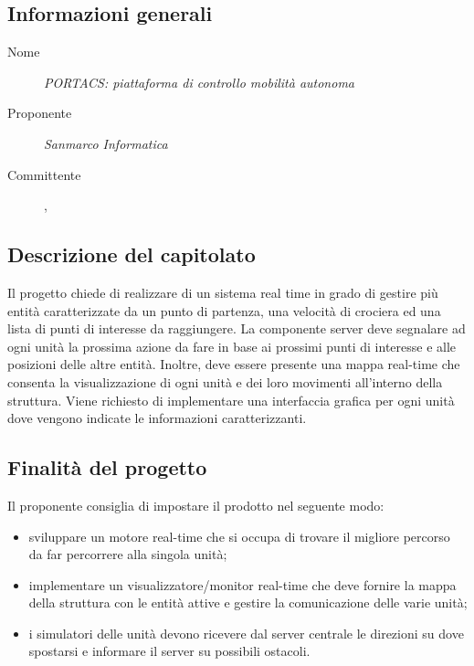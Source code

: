
  \subsection{Informazioni generali}
  \begin{description}
    \item[Nome] \textit{PORTACS: piattaforma di controllo mobilità autonoma}
    \item[Proponente] \textit{Sanmarco Informatica}
    \item[Committente] \VT{}, \CR{}
  \end{description}

  \subsection{Descrizione del capitolato}
Il progetto chiede di realizzare di un sistema real time in grado di gestire più entità caratterizzate da un punto di partenza, una velocità di crociera ed una lista di punti di interesse da raggiungere. La componente server deve segnalare ad ogni unità la prossima azione da fare in base ai prossimi punti di interesse e alle posizioni delle altre entità. Inoltre, deve essere presente una mappa real-time che consenta la visualizzazione di ogni unità e dei loro movimenti all'interno della struttura. Viene richiesto di implementare una interfaccia grafica per ogni unità dove vengono indicate le informazioni caratterizzanti.

  \subsection{Finalità del progetto}
Il proponente consiglia di impostare il prodotto nel seguente modo:
  \begin{itemize}
\item sviluppare un motore real-time che si occupa di trovare il migliore percorso da far percorrere alla singola unità;
\item implementare un visualizzatore/monitor real-time che deve fornire la mappa della struttura con le entità attive e gestire la comunicazione delle varie unità;
\item i simulatori delle unità devono ricevere dal server centrale le direzioni su dove spostarsi e informare il server su possibili ostacoli.
  \end{itemize}

